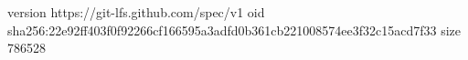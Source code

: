 version https://git-lfs.github.com/spec/v1
oid sha256:22e92ff403f0f92266cf166595a3adfd0b361cb221008574ee3f32c15acd7f33
size 786528
